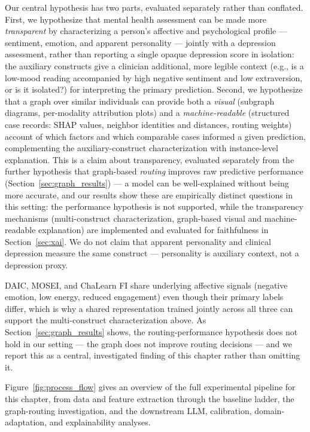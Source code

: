 \documentclass[12pt,oneside]{book}
\begin{document}
Our central hypothesis has two parts, evaluated separately rather than conflated. First, we hypothesize that mental health assessment can be made more \emph{transparent} by characterizing a person's affective and psychological profile — sentiment, emotion, and apparent personality — jointly with a depression assessment, rather than reporting a single opaque depression score in isolation: the auxiliary constructs give a clinician additional, more legible context (e.g., is a low-mood reading accompanied by high negative sentiment and low extraversion, or is it isolated?) for interpreting the primary prediction. Second, we hypothesize that a graph over similar individuals can provide both a \emph{visual} (subgraph diagrams, per-modality attribution plots) and a \emph{machine-readable} (structured case records: SHAP values, neighbor identities and distances, routing weights) account of which factors and which comparable cases informed a given prediction, complementing the auxiliary-construct characterization with instance-level explanation. This is a claim about transparency, evaluated separately from the further hypothesis that graph-based \emph{routing} improves raw predictive performance (Section~\ref{sec:graph_results}) — a model can be well-explained without being more accurate, and our results show these are empirically distinct questions in this setting: the performance hypothesis is not supported, while the transparency mechanisms (multi-construct characterization, graph-based visual and machine-readable explanation) are implemented and evaluated for faithfulness in Section~\ref{sec:xai}. We do not claim that apparent personality and clinical depression measure the same construct — personality is auxiliary context, not a depression proxy.

DAIC, MOSEI, and ChaLearn FI share underlying affective signals (negative emotion, low energy, reduced engagement) even though their primary labels differ, which is why a shared representation trained jointly across all three can support the multi-construct characterization above. As Section~\ref{sec:graph_results} shows, the routing-performance hypothesis does not hold in our setting — the graph does not improve routing decisions — and we report this as a central, investigated finding of this chapter rather than omitting it.

Figure~\ref{fig:process_flow} gives an overview of the full experimental pipeline for this chapter, from data and feature extraction through the baseline ladder, the graph-routing investigation, and the downstream LLM, calibration, domain-adaptation, and explainability analyses.
\end{document}

